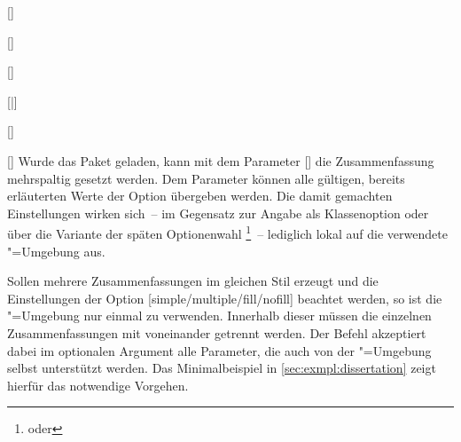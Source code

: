\begin{Declaration}{[]}
\begin{Declaration}[v2.02]{}
\begin{Declaration}{[]}
\begin{Declaration}[v2.02]{%
  []%
}
\begin{Declaration}[v2.02]{%
  [\PBoolean|]%
}
\begin{Declaration}{[]}
\begin{Declaration}{[\PSet]}
Wurde das Paket  geladen, kann mit dem Parameter 
[] die Zusammenfassung 
mehrspaltig gesetzt werden. Dem Parameter  
können alle gültigen, bereits erläuterten Werte der Option  
übergeben werden. Die damit gemachten Einstellungen wirken sich~-- im Gegensatz 
zur Angabe als Klassenoption oder über die Variante der späten Optionenwahl%
\footnote{%
   oder
}~-- lediglich lokal auf die verwendete "=Umgebung aus.

Sollen mehrere Zusammenfassungen im gleichen Stil erzeugt und die Einstellungen 
der Option [simple/multiple/fill/nofill] beachtet werden, so 
ist die "=Umgebung nur einmal zu verwenden. Innerhalb 
dieser müssen die einzelnen Zusammenfassungen mit  
voneinander getrennt werden. Der Befehl akzeptiert dabei im optionalen Argument 
alle Parameter, die auch von der "=Umgebung selbst 
unterstützt werden. Das Minimalbeispiel in \autoref{sec:exmpl:dissertation} 
zeigt hierfür das notwendige Vorgehen.
%
\end{Declaration}
\end{Declaration}
\end{Declaration}
\end{Declaration}
\end{Declaration}
\end{Declaration}
\end{Declaration}
%


